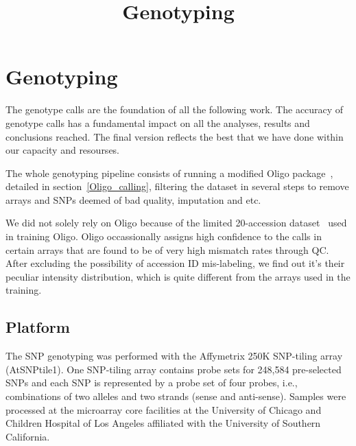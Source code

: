 \documentclass[a4paper,10pt]{article}
\title{Genotyping}
\begin{document}
\maketitle

\begin{abstract}

\end{abstract}

\tableofcontents

\section{Genotyping}
The genotype calls are the foundation of all the following work. The accuracy of genotype calls has a fundamental impact on all the analyses, results and conclusions reached. The final version reflects the best that we have done within our capacity and resourses.

The whole genotyping pipeline consists of running a modified Oligo package~\cite{Carvalho2007}, detailed in section~\ref{Oligo_calling}, filtering the dataset in several steps to remove arrays and SNPs deemed of bad quality, imputation and etc.

We did not solely rely on Oligo because of the limited 20-accession dataset~\cite{Clark2007a} used in training Oligo. Oligo occassionally assigns high confidence to the calls in certain arrays that are found to be of very high mismatch rates through QC. After excluding the possibility of accession ID mis-labeling, we find out it's their peculiar intensity distribution, which is quite different from the arrays used in the training.

\subsection{Platform}
The SNP genotyping was performed with the Affymetrix 250K SNP-tiling array (AtSNPtile1). One SNP-tiling array contains probe sets for 248,584 pre-selected SNPs and each SNP is represented by a probe set of four probes, i.e., combinations of two alleles and two strands (sense and anti-sense). Samples were processed at the microarray core facilities at the University of Chicago and Children Hospital of Los Angeles affiliated with the University of Southern California.
\end{document}
